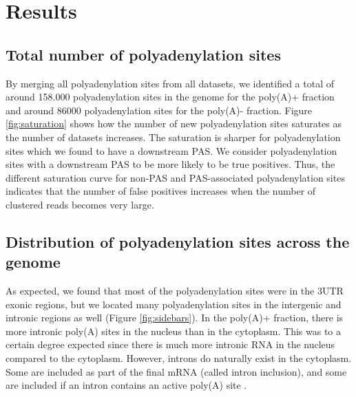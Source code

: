 \section{Results}
\subsection{Total number of polyadenylation sites}
By merging all polyadenylation sites from all datasets, we identified a total
of around 158.000 polyadenylation sites in the genome for the poly(A)+ fraction
and around 86000 polyadenylation sites for the poly(A)- fraction. Figure
\ref{fig:saturation} shows how the number of new polyadenylation sites
saturates as the number of datasets increases. The saturation is sharper for
polyadenylation sites which we found to have a downstream PAS. We
consider polyadenylation sites with a downstream PAS to be more likely to be
true positives. Thus, the different saturation curve for non-PAS and
PAS-associated polyadenylation sites indicates that the number of false
positives increases when the number of clustered reads becomes very large. 

\subsection{Distribution of polyadenylation sites across the genome}
As expected, we found that most of the polyadenylation sites were in the 3\p UTR
exonic regions, but we located many polyadenylation sites in the intergenic
and intronic regions as well (Figure \ref{fig:sidebars}). In the poly(A)+
fraction, there is more intronic poly(A) sites in the nucleus than in the
cytoplasm. This was to a certain degree expected since there is much more
intronic RNA in the nucleus compared to the cytoplasm. However, introns do
naturally exist in the cytoplasm. Some are included as part of the final mRNA
(called intron inclusion), and some are included if an intron contains an
active poly(A) site \cite{tian_widespread_2007}. 


